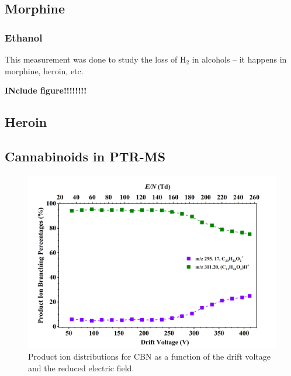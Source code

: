 \subsection{Morphine}




\subsubsection{Ethanol}

This measurement was done to study the loss of H$_2$ in alcohols -- it happens in morphine, heroin, etc.

\textbf{INclude figure!!!!!!!!}


\subsection{Heroin}



\subsection{Cannabinoids in PTR-MS}


\begin{figure}[htb]
\centering
\includegraphics[width=0.8\linewidth]{pics/other_drugs/CBN-br.png}
\caption{Product ion distributions for CBN as a function of the drift voltage and the reduced electric field.}
\label{fig:DR_CBN}
\end{figure}


